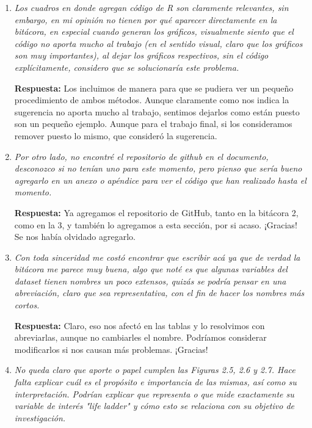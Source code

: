 \begin{enumerate}
    \item \textit{Los cuadros en donde agregan código de R son claramente relevantes, sin embargo, en mi opinión no tienen por qué aparecer directamente en la bitácora, en especial cuando generan los gráficos, visualmente siento que el código no aporta mucho al trabajo (en el sentido visual, claro que los gráficos son muy importantes), al dejar los gráficos respectivos, sin el código explícitamente, considero que se solucionaría este problema.}

    \textbf{Respuesta:} Los incluimos de manera para que se pudiera ver un pequeño procedimiento de ambos métodos. Aunque claramente como nos indica la sugerencia no aporta mucho al trabajo, sentimos dejarlos como están puesto son un pequeño ejemplo. Aunque para el trabajo final, si los consideramos remover puesto lo mismo, que consideró la sugerencia. 

    \item \textit{Por otro lado, no encontré el repositorio de github en el documento, desconozco si no tenían uno para este momento, pero pienso que sería bueno agregarlo en un anexo o apéndice para ver el código que han realizado hasta el momento.}

    \textbf{Respuesta:} Ya agregamos el repositorio de GitHub, tanto en la bitácora 2, como en la 3, y también lo agregamos a esta sección, por si acaso. ¡Gracias! Se nos había olvidado agregarlo.

    \item \textit{Con toda sinceridad me costó encontrar que escribir acá ya que de verdad la bitácora me parece muy buena, algo que noté es que algunas variables del dataset tienen nombres un poco extensos, quizás se podría pensar en una abreviación, claro que sea representativa, con el fin de hacer los nombres más cortos.}

    \textbf{Respuesta:} Claro, eso nos afectó en las tablas y lo resolvimos con abreviarlas, aunque no cambiarles el nombre. Podríamos considerar modificarlos si nos causan más problemas. ¡Gracias!

    \item \textit{No queda claro que aporte o papel cumplen las Figuras 2.5, 2.6 y 2.7. Hace falta explicar cuál es el propósito e importancia de las mismas, así como su interpretación. Podrían explicar que representa o que mide exactamente su variable de interés "life ladder" y cómo esto se relaciona con su objetivo de investigación.}


\end{enumerate}

